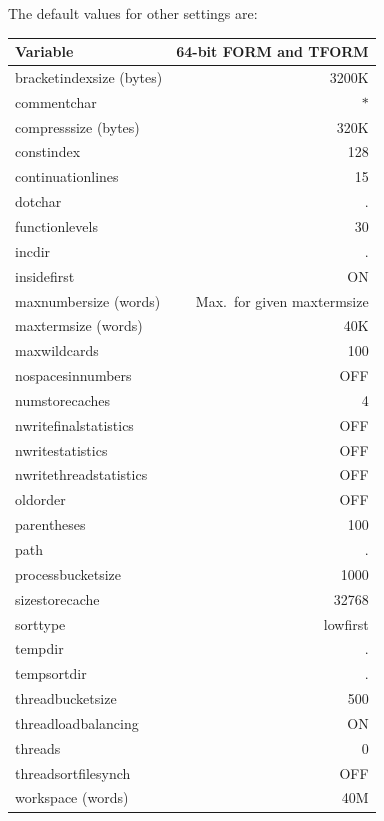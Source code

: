 The default values for other settings are:
\begin{center}
\begin{tabular}{lr}
Variable         &      64-bit FORM and TFORM \\ \hline
bracketindexsize (bytes) & 3200K        \\
commentchar &              $*$          \\
compresssize (bytes)&      320K         \\
constindex &               128          \\
continuationlines &        15           \\
dotchar &                  .            \\
functionlevels &           30           \\
incdir &                   .            \\
insidefirst &              ON           \\
maxnumbersize (words) &    Max.~for given maxtermsize \\
maxtermsize (words) &      40K          \\
maxwildcards &             100          \\
nospacesinnumbers &        OFF          \\
numstorecaches &           4            \\
nwritefinalstatistics &    OFF          \\
nwritestatistics &         OFF          \\
nwritethreadstatistics &   OFF          \\
oldorder &                 OFF          \\
parentheses &              100          \\
path &                     .            \\
processbucketsize &        1000         \\
sizestorecache &           32768        \\
sorttype &                 lowfirst     \\
tempdir &                  .            \\
tempsortdir &              .            \\
threadbucketsize &         500          \\
threadloadbalancing &      ON           \\
threads &                  0            \\
threadsortfilesynch &      OFF          \\
workspace (words)&         40M
\end{tabular}
\end{center}


